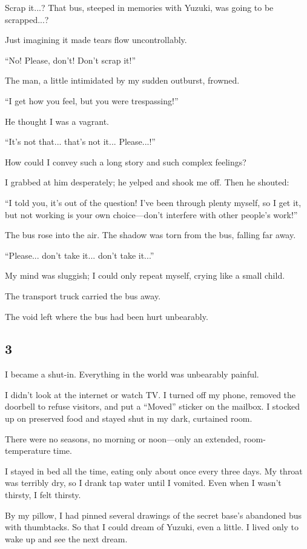 \documentclass[
    a4paper,
    12pt,
    twoside,
    openany,
    UTF8,
    fontset=windows
]{ctexbook}
\begin{document}
Scrap it...? That bus, steeped in memories with Yuzuki, was going to be scrapped...?

Just imagining it made tears flow uncontrollably.

``No! Please, don't! Don't scrap it!''

The man, a little intimidated by my sudden outburst, frowned.

``I get how you feel, but you were trespassing!''

He thought I was a vagrant.

``It's not that... that's not it... Please...!''

How could I convey such a long story and such complex feelings?

I grabbed at him desperately; he yelped and shook me off. Then he shouted:

``I told you, it's out of the question! I've been through plenty myself, so I get it, but not working is your own choice---don't interfere with other people's work!''

The bus rose into the air. The shadow was torn from the bus, falling far away.

``Please... don't take it... don't take it...''

My mind was sluggish; I could only repeat myself, crying like a small child.

The transport truck carried the bus away.

The void left where the bus had been hurt unbearably.


\subsection*{3}

I became a shut-in. Everything in the world was unbearably painful.

I didn't look at the internet or watch TV. I turned off my phone, removed the doorbell to refuse visitors, and put a ``Moved'' sticker on the mailbox. I stocked up on preserved food and stayed shut in my dark, curtained room.

There were no seasons, no morning or noon---only an extended, room-temperature time.

I stayed in bed all the time, eating only about once every three days. My throat was terribly dry, so I drank tap water until I vomited. Even when I wasn't thirsty, I felt thirsty.

By my pillow, I had pinned several drawings of the secret base's abandoned bus with thumbtacks. So that I could dream of Yuzuki, even a little. I lived only to wake up and see the next dream.
\end{document}
